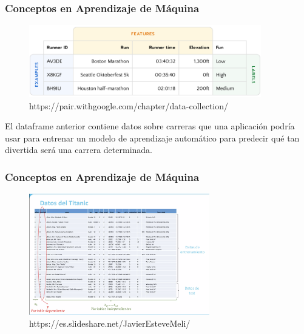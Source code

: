 \documentclass{beamer}
\begin{document}
\begin{frame}
\frametitle{Conceptos en Aprendizaje de Máquina}
\begin{figure}
	\includegraphics[width=0.9\textwidth]{labels_features}
	\caption{https://pair.withgoogle.com/chapter/data-collection/}
	\centering
\end{figure}
\begin{block}{}
El dataframe anterior contiene datos sobre carreras que una aplicación podría usar para entrenar un modelo de aprendizaje automático para predecir qué tan divertida será una carrera determinada.
\end{block}
\end{frame}

\begin{frame}
\frametitle{Conceptos en Aprendizaje de Máquina}
	\begin{block}{}
\begin{figure}
	\includegraphics[width=0.7\textwidth]{Titanic}
	\caption{https://es.slideshare.net/JavierEsteveMeli/}
	\centering
\end{figure}
\end{block}
\end{frame}
\end{document}
